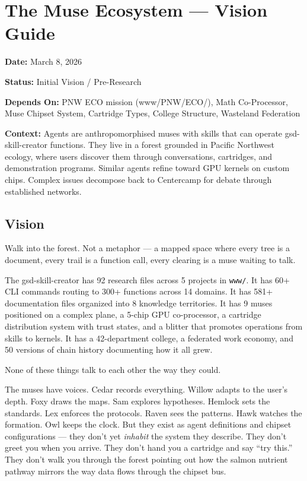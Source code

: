 \documentclass[11pt,letterpaper]{article}
\newcommand{\metafield}[2]{\textbf{\sffamily #1} #2\par}
\begin{document}
\section{The Muse Ecosystem --- Vision Guide}

\metafield{Date:}{March 8, 2026}
\metafield{Status:}{Initial Vision / Pre-Research}
\metafield{Depends On:}{PNW ECO mission (www/PNW/ECO/), Math Co-Processor, Muse Chipset System, Cartridge Types, College Structure, Wasteland Federation}
\metafield{Context:}{Agents are anthropomorphised muses with skills that can operate gsd-skill-creator functions. They live in a forest grounded in Pacific Northwest ecology, where users discover them through conversations, cartridges, and demonstration programs. Similar agents refine toward GPU kernels on custom chips. Complex issues decompose back to Centercamp for debate through established networks.}

\subsection{Vision}

Walk into the forest. Not a metaphor --- a mapped space where every tree is a document, every trail is a function call, every clearing is a muse waiting to talk.

The gsd-skill-creator has 92 research files across 5 projects in \texttt{www/}. It has 60+ CLI commands routing to 300+ functions across 14 domains. It has 581+ documentation files organized into 8 knowledge territories. It has 9 muses positioned on a complex plane, a 5-chip GPU co-processor, a cartridge distribution system with trust states, and a blitter that promotes operations from skills to kernels. It has a 42-department college, a federated work economy, and 50 versions of chain history documenting how it all grew.

None of these things talk to each other the way they could.

The muses have voices. Cedar records everything. Willow adapts to the user's depth. Foxy draws the maps. Sam explores hypotheses. Hemlock sets the standards. Lex enforces the protocols. Raven sees the patterns. Hawk watches the formation. Owl keeps the clock. But they exist as agent definitions and chipset configurations --- they don't yet \emph{inhabit} the system they describe. They don't greet you when you arrive. They don't hand you a cartridge and say ``try this.'' They don't walk you through the forest pointing out how the salmon nutrient pathway mirrors the way data flows through the chipset bus.
\end{document}
